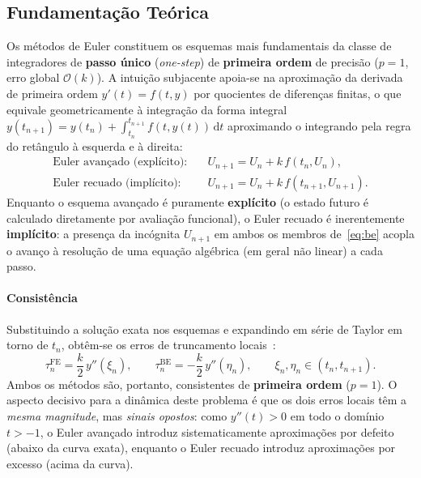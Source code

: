 \documentclass[12pt, a4paper]{article}
\begin{document}
\subsection{Fundamentação Teórica}
\label{sec:a-teoria}
Os métodos de Euler constituem os esquemas mais fundamentais da classe de integradores de \textbf{passo único} (\emph{one-step}) de \textbf{primeira ordem} de precisão ($p = 1$, erro global $\mathcal{O}(k)$). A intuição subjacente apoia-se na aproximação da derivada de primeira ordem $y'(t) = f(t, y)$ por quocientes de diferenças finitas, o que equivale geometricamente à integração da forma integral $y(t_{n+1}) = y(t_n) + \int_{t_n}^{t_{n+1}} f(t, y(t))\,\mathrm{d}t$ aproximando o integrando pela regra do retângulo à esquerda e à direita:
\begin{align}
  \text{Euler avançado (explícito):}\quad & U_{n+1} = U_n + k\, f(t_n, U_n), \label{eq:fe}\\
  \text{Euler recuado (implícito):}\quad  & U_{n+1} = U_n + k\, f(t_{n+1}, U_{n+1}). \label{eq:be}
\end{align}
Enquanto o esquema avançado é puramente \textbf{explícito} (o estado futuro é calculado diretamente por avaliação funcional), o Euler recuado é inerentemente \textbf{implícito}: a presença da incógnita $U_{n+1}$ em ambos os membros de~\eqref{eq:be} acopla o avanço à resolução de uma equação algébrica (em geral não linear) a cada passo.

\paragraph{Consistência} Substituindo a solução exata nos
esquemas e expandindo em série de Taylor em torno de $t_n$, obtêm-se os erros de
truncamento locais~\cite{leveque2007,suli2003}:
\begin{equation}\label{eq:lte}
  \tau^{\text{FE}}_n = \frac{k}{2}\,y''(\xi_n), \qquad
  \tau^{\text{BE}}_n = -\frac{k}{2}\,y''(\eta_n),
  \qquad \xi_n,\eta_n \in (t_n, t_{n+1}).
\end{equation}
Ambos os métodos são, portanto, consistentes de \textbf{primeira ordem} ($p = 1$). O aspecto
decisivo para a dinâmica deste problema é que os dois erros locais têm a
\emph{mesma magnitude}, mas \emph{sinais opostos}: como $y''(t) > 0$ em todo o domínio $t > -1$,
o Euler avançado introduz sistematicamente aproximações por defeito (abaixo da curva exata),
enquanto o Euler recuado introduz aproximações por excesso (acima da curva).
\end{document}
